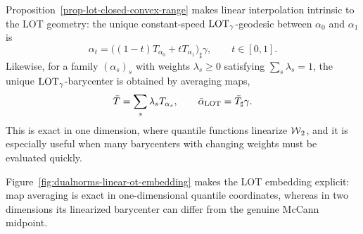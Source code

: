 Proposition~\ref{prop-lot-closed-convex-range} makes linear interpolation intrinsic to the LOT geometry: the unique constant-speed $\operatorname{LOT}_\gamma$-geodesic between $\alpha_0$ and $\alpha_1$ is
\[
	\alpha_t=\big((1-t)T_{\alpha_0}+tT_{\alpha_1}\big)_\sharp\gamma,
	\qquad t\in[0,1].
\]
Likewise, for a family $(\alpha_s)_s$ with weights $\lambda_s\geq0$ satisfying $\sum_s\lambda_s=1$, the unique $\operatorname{LOT}_\gamma$-barycenter is obtained by averaging maps,
\[
	\bar T=\sum_s\lambda_s T_{\alpha_s},
	\qquad
	\bar\alpha_{\operatorname{LOT}}=\bar T_\sharp\gamma.
\]
This is exact in one dimension, where quantile functions linearize $\operatorname{\mathcal{W}}_2$, and it is especially useful when many barycenters with changing weights must be evaluated quickly.

Figure~\ref{fig:dualnorms-linear-ot-embedding} makes the LOT embedding explicit: map averaging is exact in one-dimensional quantile coordinates, whereas in two dimensions its linearized barycenter can differ from the genuine McCann midpoint.

